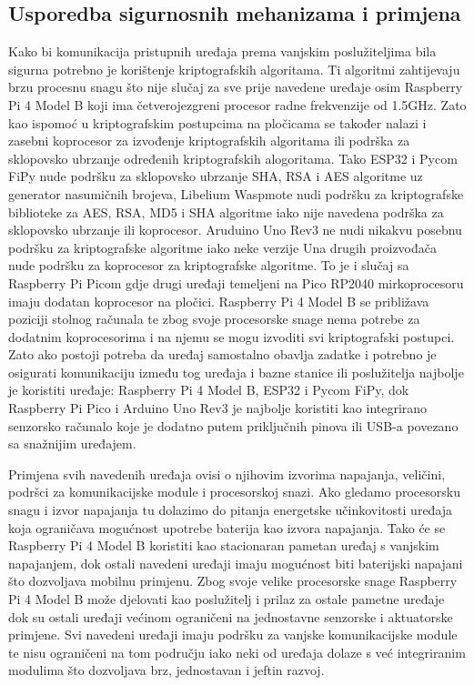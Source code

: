 \documentclass[times, utf8, diplomski]{fer}
\begin{document}
\subsection{Usporedba sigurnosnih mehanizama i primjena}
Kako bi komunikacija pristupnih uređaja prema vanjskim poslužiteljima bila sigurna potrebno je korištenje kriptografskih algoritama. Ti algoritmi zahtijevaju brzu procesnu snagu što nije slučaj za sve prije navedene uređaje osim Raspberry Pi 4 Model B koji ima četverojezgreni procesor radne frekvenzije od 1.5GHz. Zato kao ispomoć u kriptografskim postupcima na pločicama se također nalazi i zasebni koprocesor za izvođenje kriptografskih algoritama ili podrška za sklopovsko ubrzanje određenih kriptografskih alogoritama. Tako ESP32 i Pycom FiPy nude podršku za sklopovsko ubrzanje SHA, RSA i AES algoritme uz generator nasumičnih brojeva, Libelium Waspmote nudi podršku za kriptografske biblioteke za AES, RSA, MD5 i SHA algoritme iako nije navedena podrška za sklopovsko ubrzanje ili koprocesor. Aruduino Uno Rev3 ne nudi nikakvu posebnu podršku za kriptografske algoritme iako neke verzije Una drugih proizvođača nude podršku za koprocesor za kriptografske algoritme. To je i slučaj sa Raspberry Pi Picom gdje drugi uređaji temeljeni na Pico RP2040 mirkoprocesoru imaju dodatan koprocesor na pločici. Raspberry Pi 4 Model B se približava poziciji stolnog računala te zbog svoje procesorske snage nema potrebe za dodatnim koprocesorima i na njemu se mogu izvoditi svi kriptografski postupci. Zato ako postoji potreba da uređaj samostalno obavlja zadatke i potrebno je osigurati komunikaciju između tog uređaja i bazne stanice ili poslužitelja najbolje je koristiti uređaje: Raspberry Pi 4 Model B, ESP32 i Pycom FiPy, dok Raspberry Pi Pico i Arduino Uno Rev3 je najbolje koristiti kao integrirano senzorsko računalo koje je dodatno putem priključnih pinova ili USB-a povezano sa snažnijim uređajem.

Primjena svih navedenih uređaja ovisi o njihovim izvorima napajanja, veličini, podršci za komunikacijske module i procesorskoj snazi. Ako gledamo procesorsku snagu i izvor napajanja tu dolazimo do pitanja energetske učinkovitosti uređaja koja ograničava mogućnost upotrebe baterija kao izvora napajanja. Tako će se Raspberry Pi 4 Model B koristiti kao stacionaran pametan uređaj s vanjskim napajanjem, dok ostali navedeni uređaji imaju mogućnost biti baterijski napajani što dozvoljava mobilnu primjenu. Zbog svoje velike procesorske snage Raspberry Pi 4 Model B može djelovati kao poslužitelj i prilaz za ostale pametne uređaje dok su ostali uređaji većinom ograničeni na jednostavne senzorske i aktuatorske primjene. Svi navedeni uređaji imaju podršku za vanjske komunikacijske module te nisu ograničeni na tom području iako neki od uređaja dolaze s već integriranim modulima što dozvoljava brz, jednostavan i jeftin razvoj.
\end{document}
